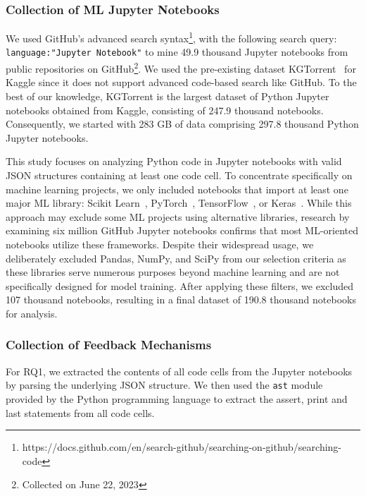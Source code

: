 \documentclass[journal]{IEEEtran}       %
\begin{document}
\subsubsection{Collection of ML Jupyter Notebooks}

We used GitHub's advanced search
syntax\footnote{https://docs.github.com/en/search-github/searching-on-github/searching-code},
with the following search query:
\lstinline[language={}]$language:"Jupyter Notebook"$ to mine 49.9
thousand Jupyter notebooks from public repositories on
GitHub\footnote{Collected on June 22, 2023}. We used the pre-existing
dataset KGTorrent~\cite{quaranta2021kgtorrent} for Kaggle since it
does not support advanced code-based search like GitHub. To the best
of our knowledge, KGTorrent is the largest dataset of Python Jupyter
notebooks obtained from Kaggle, consisting of 247.9 thousand
notebooks. Consequently, we started with 283 GB of data comprising
297.8 thousand Python Jupyter notebooks.

This study focuses on analyzing Python code in Jupyter notebooks with
valid JSON structures containing at least one code cell. To
concentrate specifically on machine learning projects, we only
included notebooks that import at least one major ML library: Scikit
Learn~\cite{pedregosa2011scikit-learn},
PyTorch~\cite{paszke2017automatic},
TensorFlow~\cite{abadi2015tensorflow}, or
Keras~\cite{chollet2015keras}. While this approach may exclude some
ML projects using alternative libraries, research by
\cite{psallidas2019data} examining six million GitHub Jupyter
notebooks confirms that most ML-oriented notebooks utilize these
frameworks. Despite their widespread usage, we deliberately excluded
Pandas, NumPy, and SciPy from our selection criteria as these
libraries serve numerous purposes beyond machine learning and are not
specifically designed for model training. After applying these
filters, we excluded 107 thousand notebooks, resulting in a final
dataset of 190.8 thousand notebooks for analysis.

\subsubsection{Collection of Feedback Mechanisms}

For RQ1, we extracted the contents of all code cells from the Jupyter
notebooks by parsing the underlying JSON structure. We then used the
\lstinline{ast} module provided by the Python programming language to
extract the assert, print and last statements from all code cells.
\end{document}
